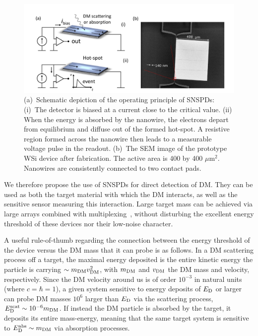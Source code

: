 \documentclass[twocolumn,10pt,prl,nofootinbib,preprintnumbers]{revtex4-1}
\begin{document}
\begin{figure}[t!]
\includegraphics[width=.48\textwidth]{Plots/SNSPD.pdf} 
\caption{\label{fig:snspd} (a)~Schematic depiction of the operating
  principle of SNSPDs: (i)~The detector is biased at a current close
  to the critical value. (ii) When the energy is absorbed by the
  nanowire, the electrons depart from equilibrium and diffuse out of
  the formed hot-spot. A resistive region formed across the nanowire
  then leads to a measurable voltage pulse in the readout. (b)~The SEM
  image of the prototype WSi device after fabrication. The active area
  is 400 by 400 $\mu$m$^2$. Nanowires are consistently connected to
  two contact pads.  }
\end{figure}

We therefore propose the use of SNSPDs for direct detection of
DM. They can be used as both the target material with which the DM
interacts, as well as the sensitive sensor measuring this
interaction. Large target mass can be achieved via large arrays
combined with multiplexing~\cite{Dauler2009}, without disturbing the excellent energy
threshold of these devices nor their low-noise character.

A useful rule-of-thumb regarding the connection between the energy
threshold of the device versus the DM mass that it can probe is as
follows. In a DM scattering process off a target, the maximal energy
deposited is the entire kinetic energy the particle is carrying $\sim
m_{\rm DM} v_{\rm DM}^2$, with $m_{\rm DM}$ and $v_{\rm DM}$ the DM
mass and velocity, respectively. Since the DM velocity around us
is of order $10^{-3}$ in natural units (where $c=\hbar=1$), a given system sensitive to
energy deposits of $E_{\rm D}$ or larger can probe DM masses $10^6$ larger
than $E_{\rm D}$ via the scattering process, $E_{\rm D}^{\rm scat}\sim
10^{-6} m_{\rm DM}$. If instead the DM particle is absorbed by the
target, it deposits its entire mass-energy, meaning that the same
target system is sensitive to $E_{\rm D}^{\rm abs}\sim m_{\rm DM}$ via
absorption processes.
\end{document}

